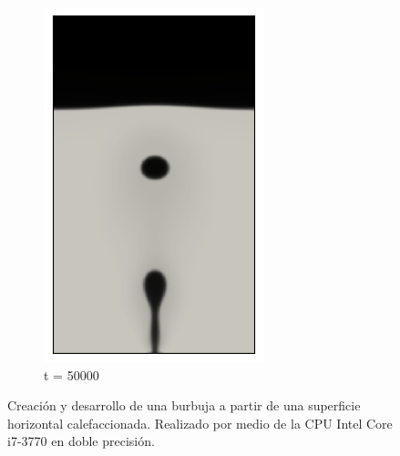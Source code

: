\begin{figure}[H]
\begin{subfigure}{0.25\textwidth}
		\includegraphics[width=\linewidth]{figs/cap4/bb_760_d50}
		\caption{t = 50000}
		\label{fig:9}
	\end{subfigure}
	\caption{Creación y desarrollo de una burbuja a partir de una superficie horizontal calefaccionada. Realizado por medio de la CPU Intel Core i7-3770 en doble precisión.}
	\label{fig:burbujas_760_doble}
\end{figure}

\newpage

\newpage

